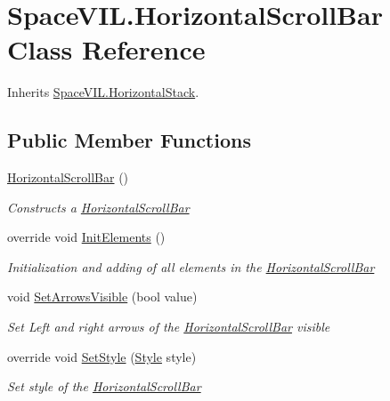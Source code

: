 \hypertarget{class_space_v_i_l_1_1_horizontal_scroll_bar}{}\section{Space\+V\+I\+L.\+Horizontal\+Scroll\+Bar Class Reference}
\label{class_space_v_i_l_1_1_horizontal_scroll_bar}


Inherits \mbox{\hyperlink{class_space_v_i_l_1_1_horizontal_stack}{Space\+V\+I\+L.\+Horizontal\+Stack}}.

\subsection*{Public Member Functions}
\begin{DoxyCompactItemize}
\item 
\mbox{\hyperlink{class_space_v_i_l_1_1_horizontal_scroll_bar_ae2deb22bc8679c96c968a955f3796806}{Horizontal\+Scroll\+Bar}} ()
\begin{DoxyCompactList}\small\item\em Constructs a \mbox{\hyperlink{class_space_v_i_l_1_1_horizontal_scroll_bar}{Horizontal\+Scroll\+Bar}} \end{DoxyCompactList}\item 
override void \mbox{\hyperlink{class_space_v_i_l_1_1_horizontal_scroll_bar_a28b7659ed7580fee8b4bf4fb951f1daa}{Init\+Elements}} ()
\begin{DoxyCompactList}\small\item\em Initialization and adding of all elements in the \mbox{\hyperlink{class_space_v_i_l_1_1_horizontal_scroll_bar}{Horizontal\+Scroll\+Bar}} \end{DoxyCompactList}\item 
void \mbox{\hyperlink{class_space_v_i_l_1_1_horizontal_scroll_bar_a5fb41915b15f89e13da665dab8fa3b31}{Set\+Arrows\+Visible}} (bool value)
\begin{DoxyCompactList}\small\item\em Set Left and right arrows of the \mbox{\hyperlink{class_space_v_i_l_1_1_horizontal_scroll_bar}{Horizontal\+Scroll\+Bar}} visible \end{DoxyCompactList}\item 
override void \mbox{\hyperlink{class_space_v_i_l_1_1_horizontal_scroll_bar_ab871a5c2d291dadd8c902efd361079d5}{Set\+Style}} (\mbox{\hyperlink{class_space_v_i_l_1_1_decorations_1_1_style}{Style}} style)
\begin{DoxyCompactList}\small\item\em Set style of the \mbox{\hyperlink{class_space_v_i_l_1_1_horizontal_scroll_bar}{Horizontal\+Scroll\+Bar}} \end{DoxyCompactList}\end{DoxyCompactItemize}
